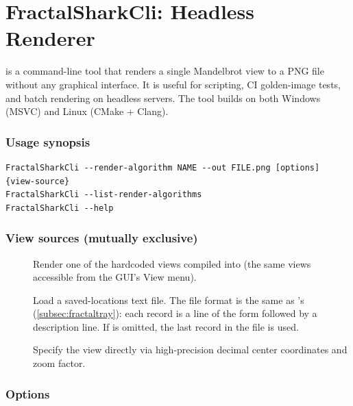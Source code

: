 \section{FractalSharkCli: Headless Renderer}
\label{sec:fractalshark-cli}

 is a command-line tool that renders a single
Mandelbrot view to a PNG file without any graphical interface.  It is
useful for scripting, CI golden-image tests, and batch rendering on
headless servers.  The tool builds on both Windows (MSVC) and Linux
(CMake + Clang).

\subsubsection*{Usage synopsis}

\begin{lstlisting}
FractalSharkCli --render-algorithm NAME --out FILE.png [options] {view-source}
FractalSharkCli --list-render-algorithms
FractalSharkCli --help
\end{lstlisting}

\subsubsection*{View sources (mutually exclusive)}

\begin{description}
  \item[]
    Render one of the hardcoded views compiled into \FractalShark{}
    (the same views accessible from the GUI's View menu).

  \item[]
    Load a saved-locations text file.  The file format is the same as
    's (\cref{subsec:fractaltray}): each record is a
    line of the form
    followed by a description line.  If  is
    omitted, the last record in the file is used.

  \item[]
    Specify the view directly via high-precision decimal center
    coordinates and zoom factor.
\end{description}

\subsubsection*{Options}

